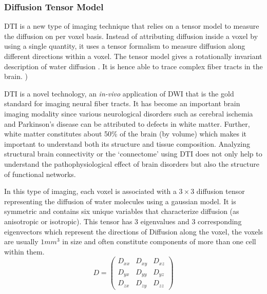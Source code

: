 \documentclass[msthesis.tex]{subfiles}
\begin{document}
\subsubsection{Diffusion Tensor Model}
\gls{DTI} is a new type of imaging technique that relies on a tensor model to measure the diffusion on per voxel basis. Instead of attributing diffusion inside a voxel by using a single quantity, it uses a tensor formalism to measure diffusion along different directions within a voxel. The tensor model gives a rotationally invariant description of water diffusion . It is hence able to trace complex fiber tracts in the brain. \citep{jones2010diffusion})

\gls{DTI} is a novel technology, an \textit{in-vivo } application of DWI that is the gold standard for imaging neural fiber tracts. It has become an important brain imaging modality since various neurological disorders such as cerebral ischemia and Parkinson’s disease can be attributed to defects in white matter. Further, white matter constitutes about 50\% of the brain (by volume) which makes it important to understand both its structure and tissue composition. Analyzing structural brain connectivity or the ‘connectome’ using \gls{DTI} does not only help to understand the pathophysiological effect of brain disorders but also the structure of functional networks.

In this type of imaging, each voxel is associated with a $3 \times 3$ diffusion tensor representing the diffusion of water molecules using a gaussian model. It is symmetric and contains six unique variables that characterize diffusion (as anisotropic or isotropic). This tensor has 3 eigenvalues and 3 corresponding eigenvectors which represent the directions of Diffusion along the voxel, the voxels are usually $1 mm^3$ in size and often constitute components of more than one cell within them.
\begin{equation}
D =
\begin{pmatrix}
D_{xx} & D_{xy} & D_{xz} \\
D_{yx} & D_{yy} & D_{yz} \\
D_{zx} & D_{zy} & D_{zz}
\end{pmatrix}  
\label{mat:difftensor}
\end{equation}
\end{document}
